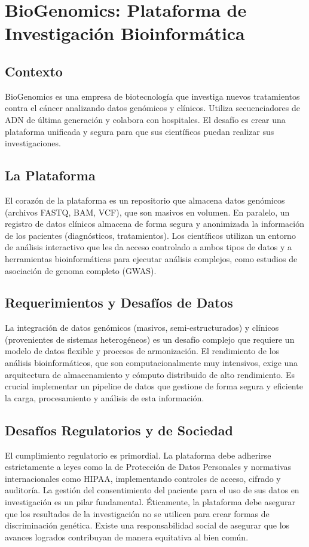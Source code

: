 \documentclass[12pt]{article}
\begin{document}
\newpage

\section{BioGenomics: Plataforma de Investigación Bioinformática}

\subsection{Contexto}
BioGenomics es una empresa de biotecnología que investiga nuevos tratamientos contra el cáncer analizando datos genómicos y clínicos. Utiliza secuenciadores de ADN de última generación y colabora con hospitales. El desafío es crear una plataforma unificada y segura para que sus científicos puedan realizar sus investigaciones.

\subsection{La Plataforma}
El corazón de la plataforma es un repositorio que almacena datos genómicos (archivos FASTQ, BAM, VCF), que son masivos en volumen. En paralelo, un registro de datos clínicos almacena de forma segura y anonimizada la información de los pacientes (diagnósticos, tratamientos). Los científicos utilizan un entorno de análisis interactivo que les da acceso controlado a ambos tipos de datos y a herramientas bioinformáticas para ejecutar análisis complejos, como estudios de asociación de genoma completo (GWAS).

\subsection{Requerimientos y Desafíos de Datos}
La integración de datos genómicos (masivos, semi-estructurados) y clínicos (provenientes de sistemas heterogéneos) es un desafío complejo que requiere un modelo de datos flexible y procesos de armonización. El rendimiento de los análisis bioinformáticos, que son computacionalmente muy intensivos, exige una arquitectura de almacenamiento y cómputo distribuido de alto rendimiento. Es crucial implementar un pipeline de datos que gestione de forma segura y eficiente la carga, procesamiento y análisis de esta información.

\subsection{Desafíos Regulatorios y de Sociedad}
El cumplimiento regulatorio es primordial. La plataforma debe adherirse estrictamente a leyes como la de Protección de Datos Personales y normativas internacionales como HIPAA, implementando controles de acceso, cifrado y auditoría. La gestión del consentimiento del paciente para el uso de sus datos en investigación es un pilar fundamental. Éticamente, la plataforma debe asegurar que los resultados de la investigación no se utilicen para crear formas de discriminación genética. Existe una responsabilidad social de asegurar que los avances logrados contribuyan de manera equitativa al bien común.
\end{document}
